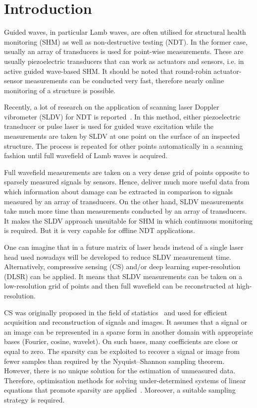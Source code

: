 \section{Introduction}
Guided waves, in particular Lamb waves, are often utilised for structural health monitoring (SHM) as well as non-destructive testing (NDT).
In the former case, usually an array of transducers is used for point-wise measurements.
These are usually piezoelectric transducers that can work as actuators and sensors, i.e. in active guided wave-based SHM.
It should be noted that round-robin actuator-sensor measurements can be conducted very fast, therefore nearly online monitoring of a structure is possible.

Recently, a lot of research on the application of scanning laser Doppler vibrometer (SLDV) for NDT is reported~\cite{Flynn2013,Kudela2015,Kudela2018d,Segers2021,Segers2022}. 
In this method, either piezoelectric transducer or pulse laser is used for guided wave excitation while the measurements are taken by SLDV at one point on the surface of an inspected structure.
The process is repeated for other points automatically in a scanning fashion until full wavefield of Lamb waves is acquired.

Full wavefield measurements are taken on a very dense grid of points opposite to sparsely measured signals by sensors.
Hence, deliver much more useful data from which information about damage can be extracted in comparison to signals measured by an array of transducers.
On the other hand, SLDV measurements take much more time than measurements conducted by an array of transducers.
It makes the SLDV approach unsuitable for SHM in which continuous monitoring is required.
But it is very capable for offline NDT applications.

One can imagine that in a future matrix of laser heads instead of a single laser head used nowadays will be developed to reduce SLDV measurement time.
Alternatively, compressive sensing (CS) and/or deep learning super-resolution (DLSR) can be applied.
It means that SLDV measurements can be taken on a low-resolution grid of points and then full wavefield can be reconstructed at high-resolution.

CS was originally proposed in the field of statistics~\cite{Candes2006,Donoho2006} and used for efficient acquisition and reconstruction of signals and images.
It assumes that a signal or an image can be represented in a sparse form in another domain with appropriate bases (Fourier, cosine, wavelet).
On such bases, many coefficients are close or equal to zero.
The sparsity can be exploited to recover a signal or image from fewer samples than required by the Nyquist–Shannon sampling theorem.
However, there is no unique solution for the estimation of unmeasured data.
Therefore, optimisation methods for solving under-determined systems of linear equations that promote sparsity are applied~\cite{Chen1998,VanEwoutBerg2008,VandenBerg2019}.
Moreover, a suitable sampling strategy is required.

